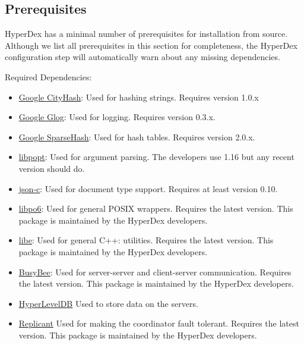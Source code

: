\subsection{Prerequisites}
\label{sec:installation:source:deps}

HyperDex has a minimal number of prerequisites for installation from source.
Although we list all prerequisites in this section for completeness, the
HyperDex configuration step will automatically warn about any missing
dependencies.

Required Dependencies:

\begin{itemize}
\item \href{http://code.google.com/p/cityhash/}{Google CityHash}:  Used for
    hashing strings.  Requires version 1.0.x
\item \href{http://code.google.com/p/google-glog/}{Google Glog}:  Used for
    logging.  Requires version 0.3.x.
\item \href{https://code.google.com/p/sparsehash/}{Google SparseHash}:  Used for
    hash tables.  Requires version 2.0.x.
\item \href{http://rpm5.org/}{libpopt}: Used for argument parsing.  The
    developers use 1.16 but any recent version should do.
\item \href{https://github.com/json-c/json-c}{json-c}:  Used for document type
    support.  Requires at least version 0.10.
\item \href{http://hyperdex.org/downloads/}{libpo6}: Used for general POSIX
    wrappers.  Requires the latest version.  This package is maintained by the
    HyperDex developers.
\item \href{http://hyperdex.org/downloads/}{libe}: Used for general C++:
    utilities.  Requires the latest version.  This package is maintained by the
    HyperDex developers.
\item \href{http://hyperdex.org/downloads/}{BusyBee}: Used for server-server
    and client-server communication.  Requires the latest version.  This package
    is maintained by the HyperDex developers.
\item \href{http://hyperdex.org/downloads/}{HyperLevelDB}  Used to store data
    on the servers.
\item \href{http://hyperdex.org/downloads/}{Replicant} Used for making the
    coordinator fault tolerant.  Requires the latest version.  This package is
    maintained by the HyperDex developers.
\end{itemize}


